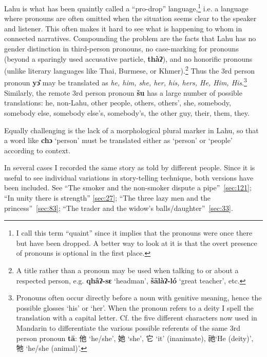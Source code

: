 Lahu is what has been quaintly called a ``pro-drop''
language,\footnote{I call this term ``quaint'' since it implies that
  the pronouns were once there but have been dropped. A better way to
  look at it is that the overt presence of pronouns is optional in the
  first place.} i.e. a language where pronouns are often omitted when
the situation seems clear to the speaker and listener. This often
makes it hard to see what is happening to whom in connected
narratives. Compounding the problem are the facts that Lahu has no
gender distinction in third-person pronouns, no case-marking for
pronouns (beyond a sparingly used accusative particle, \textbf{thàʔ}),
and no honorific pronouns (unlike literary languages like Thai,
Burmese, or Khmer).\footnote{A title rather than a pronoun may be used
  when talking to or about a respected person, e.g. \textbf{qhâʔ-sɛ}
  `headman', \textbf{šālàʔ-ló} `great teacher', etc. } Thus the 3rd
person pronoun \textbf{yɔ̂ }may be translated as \emph{he, him, she,
  her, his, hers, He, Him, His}.\footnote{Pronouns often occur
  directly before a noun with genitive meaning, hence the possible
  glosses `his' or `her'.  When the pronoun refers to a deity I spell
  the translation with a capital letter. Cf. the five different
  characters now used in Mandarin to differentiate the various
  possible referents of the same 3rd person pronoun
  \textbf{tā}: 他 `he/she', 她 `she', 它 `it' (inanimate), 祂`He
  (deity)', 牠 `he/she (animal)'.} Similarly, the remote 3rd person
pronoun \textbf{šu }has a large number of possible
translations: he, non-Lahu, other people,
others, others', she, somebody, somebody else, somebody else's,
somebody's, the other guy, their, them, they.

Equally challenging is the lack of a morphological plural marker in
Lahu, so that a word like \textbf{chɔ} `person' must be translated
either as `person' or `people' according to context.

In several cases I recorded the same story as told by different people.
Since it is useful to see individual variations in story-telling
technique, both versions have been included. See ``The smoker and the
non-smoker dispute a pipe''~\ref{sec:121}; ``In unity there is strength'' \ref{sec:27};
``The three lazy men and the princess''~\ref{sec:83}; ``The trader and the
widow's balls/daughter''~\ref{sec:33}.

